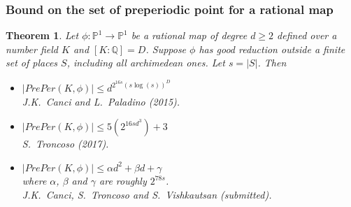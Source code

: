 \documentclass{beamer}
\def\jump{ \quad \\ \vspace{0.5cm} \pause}
\def\PP{{\mathbb P}}
\def\pp{{\mathfrak p}}
\theoremstyle{thmstyle}
\newtheorem*{mythm}{Theorem}
\theoremstyle{mystyle}
\theoremstyle{qstnstyle}
\begin{document}
\begin{frame}
\frametitle{Bound on the set of preperiodic point for a rational map} 
\begin{mythm}


Let $\phi : \PP^1\to\PP^1$ be a rational map of degree $d\geq{2}$
defined over a number field $K$ and $[K: \mathbb{Q}]=D$. 
Suppose $\phi$ has good reduction outside a finite set of places $S$, including all archimedean ones. Let $s=|S|$. Then \pause
\begin{itemize}

\item $|PrePer(K,\phi)|\leq  d^{2^{16s}\left(s\log(s)\right)^D}$
 \\ J.K.\ Canci and L.\ Paladino (2015).\jump
\item $|PrePer(K,\phi)|\leq 5\left(2^{16sd^3}\right)+3$
 \\ S.\ Troncoso (2017).\jump
\item $|PrePer(K,\phi)|\leq \alpha d^2+\beta d+\gamma$ \\  where $\alpha$, $\beta$ and $\gamma$ are roughly $2^{78s}$.
\\ J.K.\ Canci, S.\ Troncoso and S.\ Vishkautsan (submitted).

\end{itemize}
\end{mythm}
\end{frame}

\end{document}
